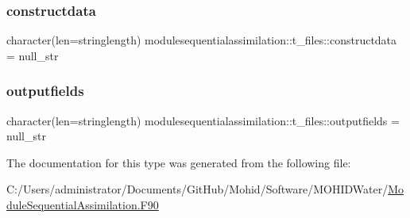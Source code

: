 \subsubsection{\texorpdfstring{constructdata}{constructdata}}
{\footnotesize\ttfamily character(len=stringlength) modulesequentialassimilation\+::t\+\_\+files\+::constructdata = null\+\_\+str\hspace{0.3cm}{\ttfamily [private]}}

\mbox{\label{structmodulesequentialassimilation_1_1t__files_ac11217962d838a4c9fc4f75ce1d4c8af}} 
\subsubsection{\texorpdfstring{outputfields}{outputfields}}
{\footnotesize\ttfamily character(len=stringlength) modulesequentialassimilation\+::t\+\_\+files\+::outputfields = null\+\_\+str\hspace{0.3cm}{\ttfamily [private]}}



The documentation for this type was generated from the following file\+:\begin{DoxyCompactItemize}
\item 
C\+:/\+Users/administrator/\+Documents/\+Git\+Hub/\+Mohid/\+Software/\+M\+O\+H\+I\+D\+Water/\mbox{\hyperlink{_module_sequential_assimilation_8_f90}{Module\+Sequential\+Assimilation.\+F90}}\end{DoxyCompactItemize}
